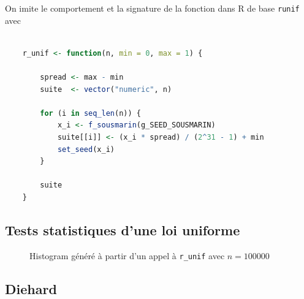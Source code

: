 \documentclass[10pt]{article} %
\begin{document}
On imite le comportement et la signature de la fonction dans R de base \texttt{runif} avec

\begin{lstlisting}[language=R]

    r_unif <- function(n, min = 0, max = 1) {

        spread <- max - min
        suite  <- vector("numeric", n)

        for (i in seq_len(n)) {
            x_i <- f_sousmarin(g_SEED_SOUSMARIN)
            suite[[i]] <- (x_i * spread) / (2^31 - 1) + min
            set_seed(x_i)
        }

        suite
    }

\end{lstlisting}


\subsection{Tests statistiques d'une loi uniforme}

\begin{figure}[h!]
    \centering
    

    \vspace{-1cm}
    \caption{Histogram généré à partir d'un appel à \texttt{r\_unif} avec $n = 100000$}

\end{figure}

\subsection{Diehard}
\end{document}

